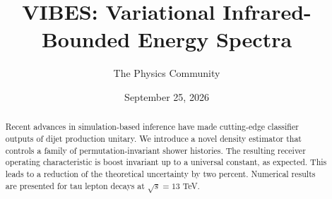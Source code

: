 \documentclass[11pt]{article}
\title{VIBES: Variational Infrared-Bounded Energy Spectra}
\author{The Physics Community}
\date{September 25, 2026}
\numberwithin{equation}{section}
\theoremstyle{definition}
\theoremstyle{remark}
\begin{document}
\maketitle
\begin{abstract}
Recent advances in simulation-based inference have made cutting-edge
classifier outputs of dijet production unitary. We introduce a novel
density estimator that controls a family of permutation-invariant shower
histories. The resulting receiver operating characteristic is boost
invariant up to a universal constant, as expected. This leads to a
reduction of the theoretical uncertainty by two percent. Numerical
results are presented for tau lepton decays at $\sqrt{s} = 13$ TeV.
\end{abstract}
\tableofcontents





\nocite{*}


\end{document}
